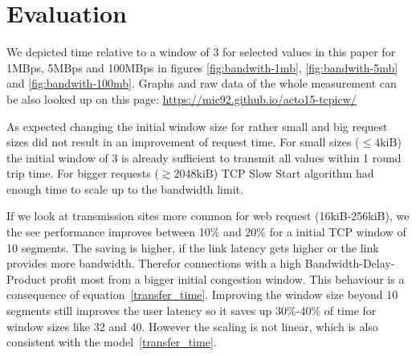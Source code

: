 \section{Evaluation}
\label{sec:evaluation}

We depicted time relative to a window of 3 for selected values in this paper for
1MBps, 5MBps and 100MBps in figures \ref{fig:bandwith-1mb},
\ref{fig:bandwith-5mb} and \ref{fig:bandwith-100mb}. Graphs and raw data of the
whole measurement can be also looked up on this page:
\url{https://mic92.github.io/acto15-tcpicw/}

As expected changing the initial window size for rather small and big request
sizes did not result in an improvement of request time. For small sizes
($\leq{}4\text{kiB}$) the initial window of 3 is already sufficient to transmit
all values within 1 round trip time. For bigger requests
($\gtrsim{}2048\text{kiB}$) TCP Slow Start algorithm had enough time to scale up
to the bandwidth limit.

If we look at transmission sites more common for web request (16kiB-256kiB), we
the see performance improves between 10\% and 20\% for a initial TCP window of
10 segments. The saving is higher, if the link latency gets higher or the link
provides more bandwidth. Therefor connections with a high
Bandwidth-Delay-Product profit most from a bigger initial congestion window.
This behaviour is a consequence of equation~\ref{transfer_time}. Improving the
window size beyond 10 segments still improves the user latency so it saves up
30\%-40\% of time for window sizes like 32 and 40. However the scaling is not
linear, which is also consistent with the model~\ref{transfer_time}.
